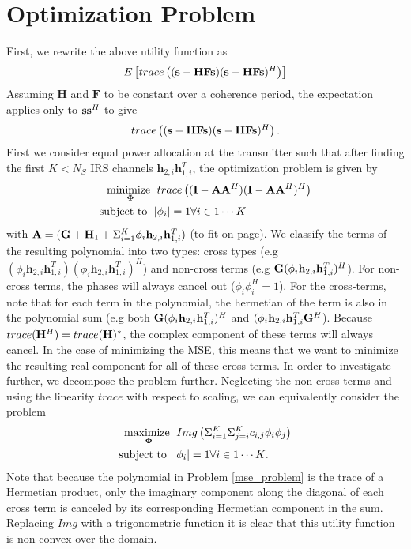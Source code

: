 \documentclass[12pt,a4paper]{report}
\begin{document}
\section{Optimization Problem}
First, we rewrite the above utility function as
	\begin{equation}
E\left[ trace\left((\mathbf{s} - \mathbf{H}\mathbf{F}\mathbf{s})(\mathbf{s} - \mathbf{H}\mathbf{F}\mathbf{s})^H \right)\right]
\end{equation}
Assuming $\mathbf{H}$ and $\mathbf{F}$ to be constant over a coherence period, the expectation applies only to $\mathbf{s} \mathbf{s}^H$ to give
	\begin{equation}
trace\left((\mathbf{s} - \mathbf{H}\mathbf{F}\mathbf{s})(\mathbf{s} - \mathbf{H}\mathbf{F}\mathbf{s})^H \right).
\end{equation}
First we consider equal power allocation at the transmitter such that after finding the first $K < N_S$ IRS channels $\mathbf{h}_{2,i}\mathbf{h}^T_{1,i}$, the optimization problem
is given by
	\begin{align}
	    \underset{\boldsymbol{\Phi}}{\text{minimize }}
	    & \; trace\left((\mathbf{I} - \mathbf{A}\mathbf{A}^H)
	   (\mathbf{I} - \mathbf{A}\mathbf{A}^H)^H \right)
	     \\
	    \text{subject to  } \; &
	    | \phi_i | = 1  \forall i \in {1 \cdots	 K}
	\end{align}\label{mse_problem}
	with $\mathbf{A} = (\mathbf{G} +  \mathbf{H}_1 + \Sigma_{i=1}^{K} \phi_i \mathbf{h}_{2,i}\mathbf{h}^T_{1,i})$ (to fit on page).
	We classify the terms of the resulting polynomial into two types:
	cross types (e.g $(\phi_i \mathbf{h}_{2,i}\mathbf{h}^T_{1,i})(\phi_i \mathbf{h}_{2,i}\mathbf{h}^T_{1,i})^H$) and non-cross terms (e.g $\mathbf{G} (\phi_i \mathbf{h}_{2,i}\mathbf{h}^T_{1,i})^H$). For non-cross terms, the phases will always cancel out ($\phi_i \phi_i^H = 1$). For the cross-terms, note that
	for each term in the polynomial, the hermetian of the term is also in the polynomial sum (e.g both $\mathbf{G} (\phi_i \mathbf{h}_{2,i}\mathbf{h}^T_{1,i})^H$ and $ (\phi_i \mathbf{h}_{2,i}\mathbf{h}^T_{1,i}\mathbf{G}^H$). Because $trace(\mathbf{H}^H) = trace(\mathbf{H})^*$, the complex component of these terms will always cancel. In the case of minimizing the MSE, this means that we want to minimize the resulting real component for all of these cross terms. In order to investigate further, we decompose the problem further. Neglecting the non-cross terms and using the linearity $trace$ with respect to scaling, we can equivalently consider the problem 
	\begin{align}
	    \underset{\boldsymbol{\Phi}}{\text{maximize }}
	    & \; Img \left( \Sigma_{i=1}^{K} \Sigma_{j=i}^{K} c_{i,j} \phi_{i} \phi_{j}  \right)
	     \\
	    \text{subject to  } \; &
	    | \phi_i | = 1  \forall i \in {1 \cdots	 K}.
	\end{align}\label{mse_problem_clear}
	Note that because the polynomial in Problem \eqref{mse_problem} is the trace of a Hermetian product, only the imaginary component along the diagonal of each cross term is canceled by its corresponding Hermetian component in the sum. Replacing $ Img$ with a trigonometric function it is clear that this utility function is non-convex over the domain.
\end{document}
